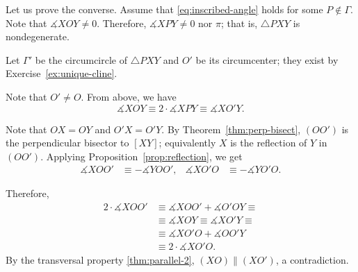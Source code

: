 Let us prove the converse.
Assume that \ref{eq:inscribed-angle} holds for some $P\notin \Gamma$.
Note that $\measuredangle X O Y\ne 0$. 
Therefore, $\measuredangle X P Y\ne 0$ nor $\pi$;
that is, $\triangle PXY$ is nondegenerate.

Let $\Gamma'$ be the circumcircle of $\triangle PXY$
and $O'$ be its circumcenter;
they exist by Exercise~\ref{ex:unique-cline}.


Note that $O'\ne O$.
From above, we have 
$$\measuredangle X O Y\equiv 2\cdot\measuredangle X P Y\equiv \measuredangle X O' Y.$$

Note that $OX=OY$ and $O'X=O'Y$.
By Theorem~\ref{thm:perp-bisect},
$(OO')$ is the perpendicular bisector to $[XY]$;
equivalently $X$ is the reflection of $Y$ in $(OO')$.
Applying Proposition~\ref{prop:reflection}, we get
\begin{align*}
\measuredangle X O O'&\equiv -\measuredangle Y O O',
&
\measuredangle X O' O&\equiv -\measuredangle Y O' O.
\end{align*}

Therefore, 
\begin{align*}
2\cdot \measuredangle X O O'
&\equiv\measuredangle X O O'+\measuredangle O' O Y
\equiv
\\
&\equiv \measuredangle X O Y\equiv \measuredangle X O' Y\equiv
\\
&\equiv\measuredangle X O' O+\measuredangle O O' Y
\\
&\equiv 2\cdot \measuredangle X O' O.
\end{align*}
By the transversal property \ref{thm:parallel-2},
$(X O)\parallel (XO')$, a contradiction.
\qeds

